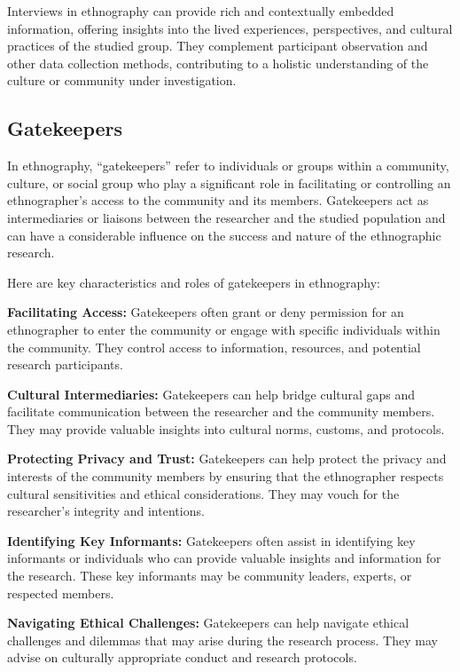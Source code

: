 \documentclass[
  b5paper]{book}
\begin{document}
Interviews in ethnography can provide rich and contextually embedded information, offering insights into the lived experiences, perspectives, and cultural practices of the studied group. They complement participant observation and other data collection methods, contributing to a holistic understanding of the culture or community under investigation.

\hypertarget{gatekeepers}{%
\subsection*{Gatekeepers}\label{gatekeepers}}

In ethnography, ``gatekeepers'' refer to individuals or groups within a community, culture, or social group who play a significant role in facilitating or controlling an ethnographer's access to the community and its members. Gatekeepers act as intermediaries or liaisons between the researcher and the studied population and can have a considerable influence on the success and nature of the ethnographic research.

Here are key characteristics and roles of gatekeepers in ethnography:

\textbf{Facilitating Access:} Gatekeepers often grant or deny permission for an ethnographer to enter the community or engage with specific individuals within the community. They control access to information, resources, and potential research participants.

\textbf{Cultural Intermediaries:} Gatekeepers can help bridge cultural gaps and facilitate communication between the researcher and the community members. They may provide valuable insights into cultural norms, customs, and protocols.

\textbf{Protecting Privacy and Trust:} Gatekeepers can help protect the privacy and interests of the community members by ensuring that the ethnographer respects cultural sensitivities and ethical considerations. They may vouch for the researcher's integrity and intentions.

\textbf{Identifying Key Informants:} Gatekeepers often assist in identifying key informants or individuals who can provide valuable insights and information for the research. These key informants may be community leaders, experts, or respected members.

\textbf{Navigating Ethical Challenges:} Gatekeepers can help navigate ethical challenges and dilemmas that may arise during the research process. They may advise on culturally appropriate conduct and research protocols.
\end{document}
